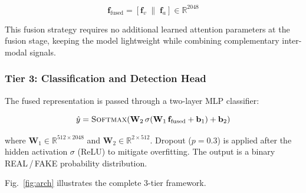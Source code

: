 \documentclass[conference]{IEEEtran}
\begin{document}
\begin{equation}
  \mathbf{f}_{\text{fused}} = [\mathbf{f}_v \;\|\; \mathbf{f}_a] \in \mathbb{R}^{2048}
  \label{eq:concat_fusion}
\end{equation}

This fusion strategy requires no additional learned attention parameters at the fusion stage, keeping the model lightweight while combining complementary inter-modal signals.

\subsubsection{Tier 3: Classification and Detection Head}
The fused representation is passed through a two-layer MLP classifier:

\begin{equation}
  \hat{y} = \textsc{Softmax}\!\left(\mathbf{W}_2\,\sigma\!\left(\mathbf{W}_1\,\mathbf{f}_{\text{fused}} + \mathbf{b}_1\right) + \mathbf{b}_2\right)
  \label{eq:classifier}
\end{equation}

where $\mathbf{W}_1 \in \mathbb{R}^{512 \times 2048}$ and $\mathbf{W}_2 \in \mathbb{R}^{2 \times 512}$. Dropout ($p = 0.3$) is applied after the hidden activation $\sigma$ (ReLU) to mitigate overfitting. The output is a binary REAL\,/\,FAKE probability distribution.

Fig.~\ref{fig:arch} illustrates the complete 3-tier framework.
\end{document}

